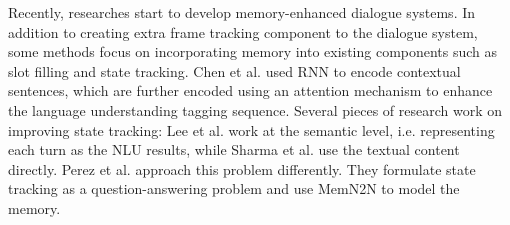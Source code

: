 Recently, researches start to develop memory-enhanced dialogue systems.
In addition to creating extra frame tracking component to the dialogue system, some methods focus on incorporating memory into existing components such as slot filling and state tracking. Chen et al. \cite{chen2016end} used RNN to encode contextual sentences, which are further encoded using an attention mechanism to enhance the language understanding tagging sequence. Several pieces of research work on improving state tracking: Lee et al. \cite{lee2016task} work at the semantic level, i.e. representing each turn as the NLU results, while Sharma et al. \cite{sharma2019improving} use the textual content directly. Perez et al. \cite{perez2016dialog} approach this problem differently. They formulate state tracking as a question-answering problem and use MemN2N \cite{weston2014memory} to model the memory.



